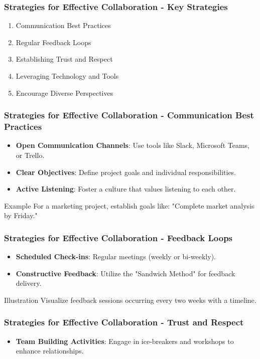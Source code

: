 \documentclass[aspectratio=169]{beamer}
\begin{document}
\begin{frame}[fragile]
    \frametitle{Strategies for Effective Collaboration - Key Strategies}
    \begin{enumerate}
        \item Communication Best Practices
        \item Regular Feedback Loops
        \item Establishing Trust and Respect
        \item Leveraging Technology and Tools
        \item Encourage Diverse Perspectives
    \end{enumerate}
\end{frame}

\begin{frame}[fragile]
    \frametitle{Strategies for Effective Collaboration - Communication Best Practices}
    \begin{itemize}
        \item \textbf{Open Communication Channels}: Use tools like Slack, Microsoft Teams, or Trello.
        \item \textbf{Clear Objectives}: Define project goals and individual responsibilities.
        \item \textbf{Active Listening}: Foster a culture that values listening to each other.
    \end{itemize}
    \begin{block}{Example}
        For a marketing project, establish goals like: "Complete market analysis by Friday."
    \end{block}
\end{frame}

\begin{frame}[fragile]
    \frametitle{Strategies for Effective Collaboration - Feedback Loops}
    \begin{itemize}
        \item \textbf{Scheduled Check-ins}: Regular meetings (weekly or bi-weekly).
        \item \textbf{Constructive Feedback}: Utilize the "Sandwich Method" for feedback delivery.
    \end{itemize}
    \begin{block}{Illustration}
        Visualize feedback sessions occurring every two weeks with a timeline.
    \end{block}
\end{frame}

\begin{frame}[fragile]
    \frametitle{Strategies for Effective Collaboration - Trust and Respect}
    \begin{itemize}
        \item \textbf{Team Building Activities}: Engage in ice-breakers and workshops to enhance relationships.
    \end{itemize}
\end{frame}
\end{document}
